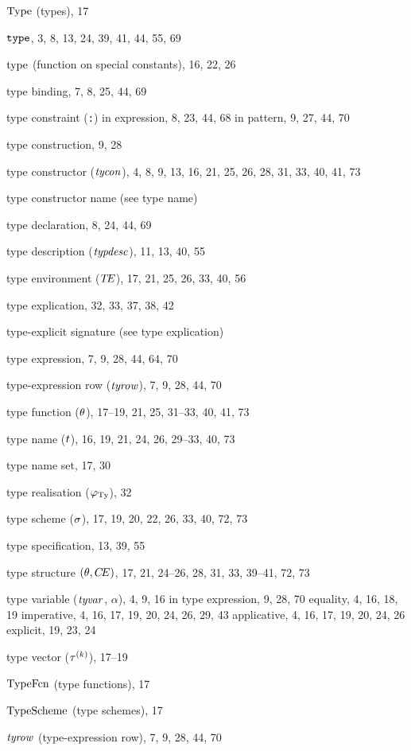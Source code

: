 \begin{theindex}
\item ${\rm Type}$ (types), 17
\item ${\tt type}$, 3, 8, 13, 24, 39, 41, 44, 55, 69
\item $\mathop{\rm type}\nolimits$ (function on special constants), 16, 22, 26
\item type binding, 7, 8, 25, 44, 69
\item type constraint (\verb+:+) 
\subitem in expression, 8, 23, 44, 68
\subitem in pattern, 9, 27, 44, 70
\item type construction, 9, 28
\item type constructor (${\it tycon}$), 4, 8, 9, 13, 16, 21, 25, 26, 28, 31, 33, 40, 41, 73
\item type constructor name (see type name) 
\item type declaration, 8, 24, 44, 69
\item type description (${\it typdesc}$), 11, 13, 40, 55
\item type environment ($\mbox{$T\!E$}$), 17, 21, 25, 26, 33, 40, 56
\item type explication, 32, 33, 37, 38, 42
\item type-explicit signature (see type explication) 
\item type expression, 7, 9, 28, 44, 64, 70
\item type-expression row (${\it tyrow}$), 7, 9, 28, 44, 70
\item type function ($\theta$), 17--19, 21, 25, 31--33, 40, 41, 73
\item type name ($t$), 16, 19, 21, 24, 26, 29--33, 40, 73
\item type name set, 17, 30
\item type realisation ($\varphi_{\rm Ty}$), 32
\item type scheme ($\sigma$), 17, 19, 20, 22, 26, 33, 40, 72, 73
\item type specification, 13, 39, 55
\item type structure $(\theta,\mbox{$C\!E$})$, 17, 21, 24--26, 28, 31, 33, 39--41, 72, 73
\item type variable (${\it tyvar}$, $\alpha$), 4, 9, 16
\subitem in type expression, 9, 28, 70
\subitem equality, 4, 16, 18, 19
\subitem imperative, 4, 16, 17, 19, 20, 24, 26, 29, 43
\subitem applicative, 4, 16, 17, 19, 20, 24, 26
\subitem explicit, 19, 23, 24
\item type vector ($\mbox{$\tau^{(k)}$}$), 17--19
\item ${\rm TypeFcn}$ (type functions), 17
\item ${\rm TypeScheme}$ (type schemes), 17
\item ${\it tyrow}$ (type-expression row), 7, 9, 28, 44, 70

\end{theindex}
